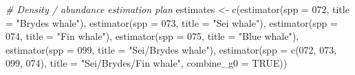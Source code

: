 \documentclass[
]{book}
\newenvironment{Shaded}{\begin{snugshade}}{\end{snugshade}}
\newcommand{\AttributeTok}[1]{\textcolor[rgb]{0.77,0.63,0.00}{#1}}
\newcommand{\CommentTok}[1]{\textcolor[rgb]{0.56,0.35,0.01}{\textit{#1}}}
\newcommand{\ConstantTok}[1]{\textcolor[rgb]{0.00,0.00,0.00}{#1}}
\newcommand{\FunctionTok}[1]{\textcolor[rgb]{0.00,0.00,0.00}{#1}}
\newcommand{\NormalTok}[1]{#1}
\newcommand{\OtherTok}[1]{\textcolor[rgb]{0.56,0.35,0.01}{#1}}
\newcommand{\StringTok}[1]{\textcolor[rgb]{0.31,0.60,0.02}{#1}}
\begin{document}
\begin{Shaded}
\begin{Highlighting}[]
  \CommentTok{\# Density / abundance estimation plan}
\NormalTok{   estimates }\OtherTok{\textless{}{-}}
      \FunctionTok{c}\NormalTok{(}\FunctionTok{estimator}\NormalTok{(}\AttributeTok{spp =} \StringTok{\textquotesingle{}072\textquotesingle{}}\NormalTok{, }\AttributeTok{title =} \StringTok{"Bryde\textquotesingle{}s whale"}\NormalTok{),}
        \FunctionTok{estimator}\NormalTok{(}\AttributeTok{spp =} \StringTok{\textquotesingle{}073\textquotesingle{}}\NormalTok{, }\AttributeTok{title =} \StringTok{"Sei whale"}\NormalTok{),}
        \FunctionTok{estimator}\NormalTok{(}\AttributeTok{spp =} \StringTok{\textquotesingle{}074\textquotesingle{}}\NormalTok{, }\AttributeTok{title =} \StringTok{"Fin whale"}\NormalTok{),}
        \FunctionTok{estimator}\NormalTok{(}\AttributeTok{spp =} \StringTok{\textquotesingle{}075\textquotesingle{}}\NormalTok{, }\AttributeTok{title =} \StringTok{"Blue whale"}\NormalTok{),}
        \FunctionTok{estimator}\NormalTok{(}\AttributeTok{spp =} \StringTok{\textquotesingle{}099\textquotesingle{}}\NormalTok{, }\AttributeTok{title =} \StringTok{"Sei/Bryde\textquotesingle{}s whale"}\NormalTok{),}
        \FunctionTok{estimator}\NormalTok{(}\AttributeTok{spp =} \FunctionTok{c}\NormalTok{(}\StringTok{\textquotesingle{}072\textquotesingle{}}\NormalTok{, }\StringTok{\textquotesingle{}073\textquotesingle{}}\NormalTok{, }\StringTok{\textquotesingle{}099\textquotesingle{}}\NormalTok{, }\StringTok{\textquotesingle{}074\textquotesingle{}}\NormalTok{), }
                  \AttributeTok{title =} \StringTok{"Sei/Bryde\textquotesingle{}s/Fin whale"}\NormalTok{,}
                  \AttributeTok{combine\_g0 =} \ConstantTok{TRUE}\NormalTok{))}
  

\end{Highlighting}
\end{Shaded}
\end{document}

